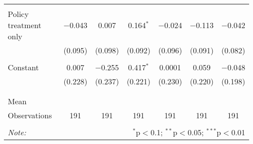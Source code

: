 \begin{tabular}{@{\extracolsep{5pt}}lcccccc}
  & & & & & & \\ 
 Policy treatment only & $-$0.043 & 0.007 & 0.164$^{*}$ & $-$0.024 & $-$0.113 & $-$0.042 \\ 
  & (0.095) & (0.098) & (0.092) & (0.096) & (0.091) & (0.082) \\ 
  & & & & & & \\ 
 Constant & 0.007 & $-$0.255 & 0.417$^{*}$ & 0.0001 & 0.059 & $-$0.048 \\ 
  & (0.228) & (0.237) & (0.221) & (0.230) & (0.220) & (0.198) \\ 
  & & & & & & \\ 
\hline \\[-1.8ex] 
Mean &  &  &  &  &  &  \\ 
Observations & 191 & 191 & 191 & 191 & 191 & 191 \\ 
\hline 
\hline \\[-1.8ex] 
\textit{Note:}  & \multicolumn{6}{r}{$^{*}$p$<$0.1; $^{**}$p$<$0.05; $^{***}$p$<$0.01} \\ 
\end{tabular} 

